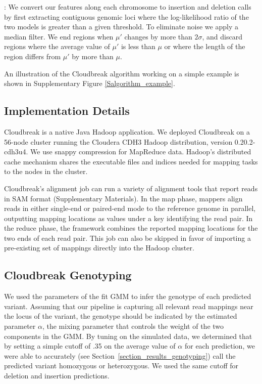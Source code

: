 \documentclass{bioinfo}
\begin{document}
\begin{methods}
\textbf{}: We convert our features along each chromosome to insertion and deletion calls by first extracting contiguous genomic loci where the log-likelihood ratio of the two models is greater than a given threshold. To eliminate noise we apply a median filter. We end regions when $\mu'$ changes by more than $2\sigma$, and discard regions where the average value of $\mu'$ is less than $\mu$ or where the length of the region differs from $\mu'$ by more than $\mu$.

An illustration of the Cloudbreak algorithm working on a simple example is shown in Supplementary Figure \ref{Salgorithm_example}.

\subsection{Implementation Details}

Cloudbreak is a native Java Hadoop application. We deployed Cloudbreak on a 56-node cluster running the Cloudera CDH3 Hadoop distribution, version 0.20.2-cdh3u4. We use snappy compression for MapReduce data. Hadoop's distributed cache mechanism shares the executable files and indices needed for mapping tasks to the nodes in the cluster. 

Cloudbreak's alignment job can run a variety of alignment tools that report reads in SAM format (Supplementary Materials). In the map phase, mappers align reads in either single-end or paired-end mode to the reference genome in parallel, outputting mapping locations as values under a key identifying the read pair. In the reduce phase, the framework combines the reported mapping locations for the two ends of each read pair. This job can also be skipped in favor of importing a pre-existing set of mappings directly into the Hadoop cluster.

\subsection{Cloudbreak Genotyping}
We used the parameters of the fit GMM to infer the genotype of each predicted variant. Assuming that our pipeline is capturing all relevant read mappings near the locus of the variant, the genotype should be indicated by the estimated parameter $\alpha$, the mixing parameter that controls the weight of the two components in the GMM. By tuning on the simulated data, we determined that by setting a simple cutoff of .35 on the average value of $\alpha$ for each prediction, we were able to accurately (see Section~\ref{section_results_genotyping}) call the predicted variant homozygous or heterozygous. We used the same cutoff for deletion and insertion predictions.


\end{methods}
\end{document}
